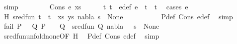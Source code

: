 \begin{isabellebody}
\ simp\isanewline
\ \ \isamarkupfalse%
\isanewline
\ \ \ \ \isamarkupfalse%
\ {\isacharparenleft}{\kern0pt}Cons\ e\ xs{\isacharparenright}{\kern0pt}\isanewline
\ \ \ \ \isamarkupfalse%
\ t{}\ t{}\ \ e{\isacharunderscore}{\kern0pt}def{\isacharcolon}{\kern0pt}\ {\isachardoublequoteopen}e\ {\isacharequal}{\kern0pt}\ {\isacharparenleft}{\kern0pt}t{}\ {\isasymapprox}{\isacharquery}{\kern0pt}\ t{}{\isacharparenright}{\kern0pt}{\isachardoublequoteclose}\ \isamarkupfalse%
\ {\isacharparenleft}{\kern0pt}cases\ e{\isacharparenright}{\kern0pt}\isanewline
\ \ \ \ \isamarkupfalse%
\ H{\isacharcolon}{\kern0pt}\ {\isachardoublequoteopen}sred{\isacharunderscore}{\kern0pt}fun\ {\isacharparenleft}{\kern0pt}{\isacharparenleft}{\kern0pt}{\isacharparenleft}{\kern0pt}t{}\ {\isasymapprox}{\isacharquery}{\kern0pt}\ t{}{\isacharparenright}{\kern0pt}\ {\isacharhash}{\kern0pt}\ xs{\isacharcomma}{\kern0pt}\ ys{\isacharparenright}{\kern0pt}{\isacharcomma}{\kern0pt}\ nabla{\isacharcomma}{\kern0pt}\ s{\isacharparenright}{\kern0pt}\ {\isacharequal}{\kern0pt}\ None{\isachardoublequoteclose}\isanewline
\ \ \ \ \ \ \isamarkupfalse%
\ {}{\isacharparenleft}{\kern0pt}{}{\isacharparenright}{\kern0pt}\ \isamarkupfalse%
\ P{\isacharunderscore}{\kern0pt}def\ Cons\ e{\isacharunderscore}{\kern0pt}def\ \isamarkupfalse%
\ simp\isanewline
\ \ \ \ \isamarkupfalse%
\ {\isachardoublequoteopen}fail\ P\ {\isasymor}\ {\isacharparenleft}{\kern0pt}{\isasymexists}{\isasymsigma}\ Q{\isachardot}{\kern0pt}\ P\ {\isasymturnstile}\ {\isasymsigma}\ {\isasymleadsto}\ Q\ {\isasymand}\ sred{\isacharunderscore}{\kern0pt}fun\ {\isacharparenleft}{\kern0pt}Q{\isacharcomma}{\kern0pt}\ nabla{\isacharcomma}{\kern0pt}\ {\isasymsigma}\ {\isasymbullet}\ s{\isacharparenright}{\kern0pt}\ {\isacharequal}{\kern0pt}\ None{\isacharparenright}{\kern0pt}{\isachardoublequoteclose}\isanewline
\ \ \ \ \ \ \isamarkupfalse%
\ sred{\isacharunderscore}{\kern0pt}fun{\isacharunderscore}{\kern0pt}unfold{\isacharunderscore}{\kern0pt}none{\isacharbrackleft}{\kern0pt}OF\ H{\isacharbrackright}{\kern0pt}\ \isamarkupfalse%
\ P{\isacharunderscore}{\kern0pt}def\ Cons\ e{\isacharunderscore}{\kern0pt}def\ \isamarkupfalse%
\ simp\isanewline
\ \ \ \ \isamarkupfalse%
\ \isamarkupfalse%

\end{isabellebody}
